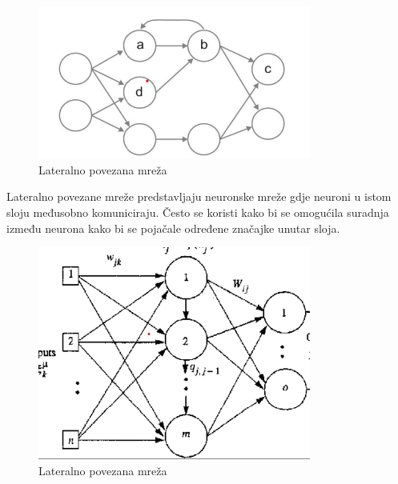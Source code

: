 \FloatBarrier
\begin{figure}[h]
    \centering
    \includegraphics[width=0.8\textwidth]{images/nn-povratna-veza}
    \caption{Lateralno povezana mreža}
    \label{fig:slika5}
\end{figure}
\FloatBarrier
\pagebreak
Lateralno povezane mreže predstavljaju neuronske mreže gdje neuroni u istom sloju međusobno komuniciraju.
Često se koristi kako bi se omogućila suradnja između neurona kako bi se pojačale određene značajke unutar sloja.
\FloatBarrier
\begin{figure}[h]
    \centering
    \includegraphics[width=0.8\textwidth]{images/Lateral-connected-nn}
    \caption{Lateralno povezana mreža}
    \label{fig:slika6}
\end{figure}
\FloatBarrier
